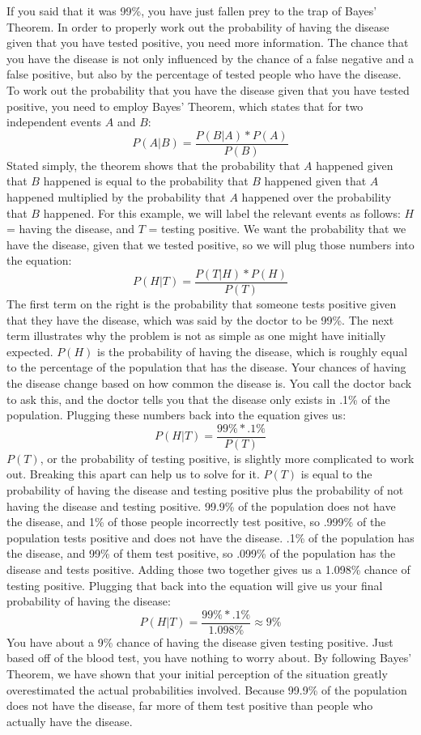 If you said that it was 99\%, you have just fallen prey to the trap of Bayes’ Theorem. In order to properly work out the probability of having the disease given that you have tested positive, you need more information. The chance that you have the disease is not only influenced by the chance of a false negative and a false positive, but also by the percentage of tested people who have the disease. To work out the probability that you have the disease given that you have tested positive, you need to employ Bayes’ Theorem, which states that for two independent events \(A\) and \(B\):\@
\[P(A|B) = \frac{P(B|A) * P(A)}{P(B)}\]
Stated simply, the theorem shows that the probability that \(A\) happened given that \(B\) happened is equal to the probability that \(B\) happened given that \(A\) happened multiplied by the probability that \(A\) happened over the probability that \(B\) happened. For this example, we will label the relevant events as follows: \(H\) = having the disease, and \(T\) = testing positive. We want the probability that we have the disease, given that we tested positive, so we will plug those numbers into the equation:
\[P(H|T) = \frac{P(T|H) * P(H)}{P(T)}\]
The first term on the right is the probability that someone tests positive given that they have the disease, which was said by the doctor to be 99\%. The next term illustrates why the problem is not as simple as one might have initially expected. \(P(H)\) is the probability of having the disease, which is roughly equal to the percentage of the population that has the disease. Your chances of having the disease change based on how common the disease is. You call the doctor back to ask this, and the doctor tells you that the disease only exists in .1\% of the population. Plugging these numbers back into the equation gives us:
\[P(H|T) = \frac{99\% * .1\%}{P(T)}\]
\(P(T)\), or the probability of testing positive, is slightly more complicated to work out. Breaking this apart can help us to solve for it. \(P(T)\) is equal to the probability of having the disease and testing positive plus the probability of not having the disease and testing positive. 99.9\% of the population does not have the disease, and 1\% of those people incorrectly test positive, so .999\% of the population tests positive and does not have the disease. .1\% of the population has the disease, and 99\% of them test positive, so .099\% of the population has the disease and tests positive. Adding those two together gives us a 1.098\% chance of testing positive. Plugging that back into the equation will give us your final probability of having the disease:
\[P(H|T) = \frac{99\% * .1\%}{1.098\%} \approx 9\%\]
You have about a 9\% chance of having the disease given testing positive. Just based off of the blood test, you have nothing to worry about. By following Bayes’ Theorem, we have shown that your initial perception of the situation greatly overestimated the actual probabilities involved. Because 99.9\% of the population does not have the disease, far more of them test positive than people who actually have the disease.

